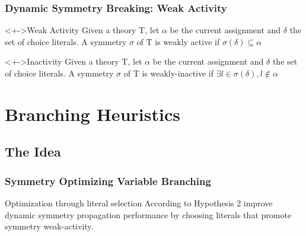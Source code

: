 \documentclass{beamer}
\begin{document}
	\begin{frame}
		\frametitle{Dynamic Symmetry Breaking: Weak Activity}

		\begin{block}<+->{Weak Activity}
			Given a theory T, let $\alpha$ be the current assignment and $\delta$ the set of
			choice literals.
			A symmetry $\sigma$ of T is weakly active if $\sigma(\delta) \subseteq \alpha$
		\end{block}

		\begin{block}<+->{Inactivity}
			Given a theory T, let $\alpha$ be the current assignment and $\delta$ the set of
			choice literals.
			A symmetry $\sigma$ of T is weakly-inactive if $\exists l \in \sigma(\delta), l \not\in \alpha$
		\end{block}
	\end{frame}

\section{Branching Heuristics}

	\subsection{The Idea}
	\begin{frame}
		\frametitle{Symmetry Optimizing Variable Branching}

		\begin{block}{Optimization through literal selection}
			According to Hypothesis 2 improve dynamic symmetry propagation performance by choosing literals that promote
			symmetry weak-activity.
		\end{block}
	\end{frame}
\end{document}
